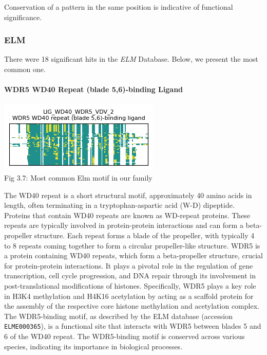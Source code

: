 \documentclass[10pt,twocolumn,letterpaper]{article}
\begin{document}
Conservation of a pattern in the same position is indicative of functional significance.

\subsubsection{ELM}

There were 18 significant hits in the \textit{ELM} Database. Below, we present the most common one.

\paragraph{WDR5 WD40 Repeat (blade 5,6)-binding Ligand}

\begin{center}
    \includegraphics[scale=1.17]{report/img/Elm.png} \\
    \small{Fig 3.7: Most common Elm motif in our family}
\end{center}


The WD40 repeat is a short structural motif, approximately 40 amino acids in length, often terminating in a tryptophan-aspartic acid (W-D) dipeptide. Proteins that contain WD40 repeats are known as WD-repeat proteins. These repeats are typically involved in protein-protein interactions and can form a beta-propeller structure. Each repeat forms a blade of the propeller, with typically 4 to 8 repeats coming together to form a circular propeller-like structure.
WDR5 is a protein containing WD40 repeats, which form a beta-propeller structure, crucial for protein-protein interactions. It plays a pivotal role in the regulation of gene transcription, cell cycle progression, and DNA repair through its involvement in post-translational modifications of histones. Specifically, WDR5 plays a key role in H3K4 methylation and H4K16 acetylation by acting as a scaffold protein for the assembly of the respective core histone methylation and acetylation complex. The WDR5-binding motif, as described by the ELM database \cite{WDR5} (accession \texttt{ELME000365}), is a functional site that interacts with WDR5 between blades 5 and 6 of the WD40 repeat. The WDR5-binding motif is conserved across various species, indicating its importance in biological processes. \\
\end{document}

